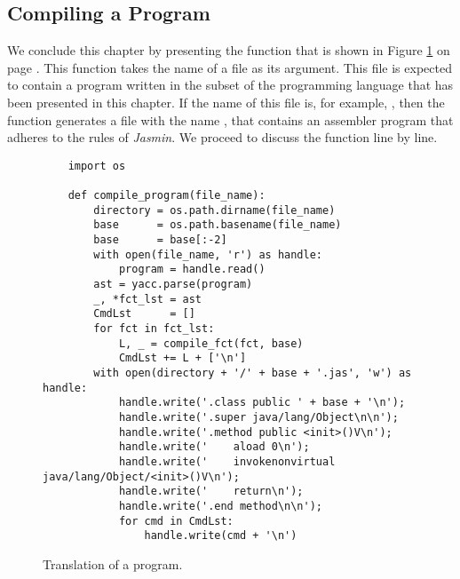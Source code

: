 \subsection{Compiling a Program}
We conclude this chapter by presenting the function  that is shown in Figure
\ref{fig:Compiler.ipynb:compile_program} on page \pageref{fig:Compiler.ipynb:compile_program}. This function
takes the name of a file as its argument.  This file is expected to contain a program written in the subset
of the programming language  that has been presented in this chapter.  If the name of this file is, for example,
, then the function  generates a file with the name ,
that contains an assembler program that adheres to the rules of \textsl{Jasmin}. We proceed to discuss the
function  line by line. 

\begin{figure}[!ht]
\centering
\begin{verbatim}
    import os
                 
    def compile_program(file_name):
        directory = os.path.dirname(file_name)
        base      = os.path.basename(file_name)
        base      = base[:-2]
        with open(file_name, 'r') as handle:
            program = handle.read() 
        ast = yacc.parse(program)
        _, *fct_lst = ast
        CmdLst      = []
        for fct in fct_lst:
            L, _ = compile_fct(fct, base)
            CmdLst += L + ['\n']
        with open(directory + '/' + base + '.jas', 'w') as handle:
            handle.write('.class public ' + base + '\n');
            handle.write('.super java/lang/Object\n\n');
            handle.write('.method public <init>()V\n');
            handle.write('    aload 0\n');
            handle.write('    invokenonvirtual java/lang/Object/<init>()V\n');
            handle.write('    return\n');
            handle.write('.end method\n\n');
            for cmd in CmdLst:
                handle.write(cmd + '\n')                
\end{verbatim}
\vspace*{-0.3cm}
\caption{Translation of a program.}
\label{fig:Compiler.ipynb:compile_program}
\end{figure}

